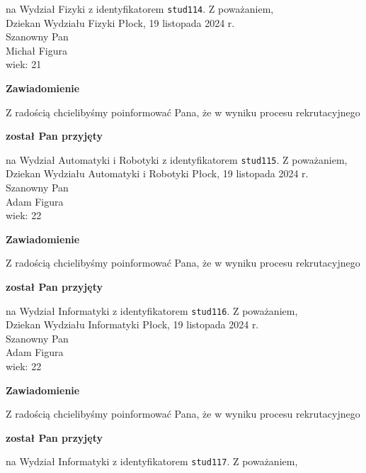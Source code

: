 \documentclass[12pt,a4paper]{article}
\begin{document}
na Wydział Fizyki z identyfikatorem \verb|stud114|. 
\vspace{2cm}
\noindent
Z poważaniem, \\
Dziekan
Wydziału Fizyki
\newpage
\hfill Płock, 19 listopada 2024 r. \\
\noindent
Szanowny Pan \\
Michał Figura \\
wiek: 21
\bigskip
\begin{center}
    {\Large\textbf{Zawiadomienie}}
\end{center}
\bigskip 
Z radością chcielibyśmy poinformować Pana, że w wyniku procesu rekrutacyjnego
\begin{center}
\textsf{\textbf{został Pan przyjęty}}
\end{center}
na Wydział Automatyki i Robotyki z identyfikatorem \verb|stud115|. 
\vspace{2cm}
\noindent
Z poważaniem, \\
Dziekan
Wydziału Automatyki i Robotyki
\newpage
\hfill Płock, 19 listopada 2024 r. \\
\noindent
Szanowny Pan \\
Adam Figura \\
wiek: 22
\bigskip
\begin{center}
    {\Large\textbf{Zawiadomienie}}
\end{center}
\bigskip 
Z radością chcielibyśmy poinformować Pana, że w wyniku procesu rekrutacyjnego
\begin{center}
\textsf{\textbf{został Pan przyjęty}}
\end{center}
na Wydział Informatyki z identyfikatorem \verb|stud116|. 
\vspace{2cm}
\noindent
Z poważaniem, \\
Dziekan
Wydziału Informatyki
\newpage
\hfill Płock, 19 listopada 2024 r. \\
\noindent
Szanowny Pan \\
Adam Figura \\
wiek: 22
\bigskip
\begin{center}
    {\Large\textbf{Zawiadomienie}}
\end{center}
\bigskip 
Z radością chcielibyśmy poinformować Pana, że w wyniku procesu rekrutacyjnego
\begin{center}
\textsf{\textbf{został Pan przyjęty}}
\end{center}
na Wydział Informatyki z identyfikatorem \verb|stud117|. 
\vspace{2cm}
\noindent
Z poważaniem, \\
\end{document}
